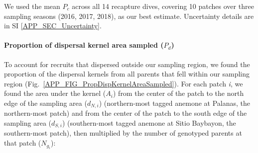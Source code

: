 \documentclass[12pt, oneside]{article}   	%
\begin{document}
We used the mean $P_c$ across all 14 recapture dives, covering 10 patches over three sampling seasons (2016, 2017, 2018), as our best estimate. Uncertainty details are in SI \ref{APP_SEC_Uncertainty}.




\paragraph*{Proportion of dispersal kernel area sampled ($P_d$)} %

To account for recruits that dispersed outside our sampling region, we found the proportion of the dispersal kernels from all parents that fell within our sampling region (Fig.\ \ref{APP_FIG_PropDispKernelAreaSampled}). For each patch \textit{i}, we found the area under the kernel ($A_i$) from the center of the patch to the north edge of the sampling area ($d_{N,i}$) (northern-most tagged anemone at Palanas, the northern-most patch) and from the center of the patch to the south edge of the sampling area ($d_{S,i}$) (southern-most tagged anemone at Sitio Baybayon, the southern-most patch), then multiplied by the number of genotyped parents at that patch ($N_{g_i}$):
\end{document}
